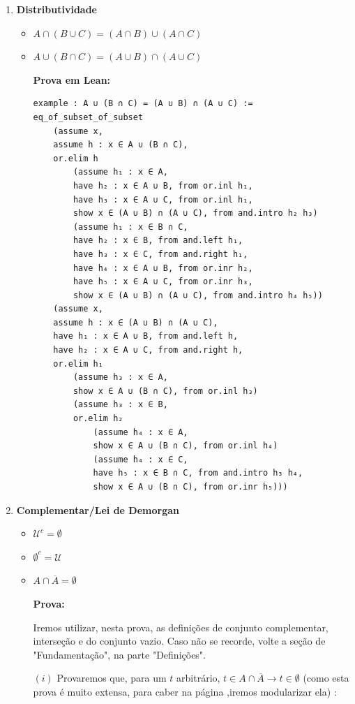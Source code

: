 \begin{enumerate}
\item{\textbf{Distributividade}}
\begin{itemize}
\item $A \cap (B \cup C) = (A \cap B) \cup (A \cap C)$
\item $A \cup (B \cap C) = (A \cup B) \cap (A \cup C)$

\textbf{Prova em Lean:}
\begin{lstlisting}
example : A ∪ (B ∩ C) = (A ∪ B) ∩ (A ∪ C) :=
eq_of_subset_of_subset
    (assume x,
    assume h : x ∈ A ∪ (B ∩ C),
    or.elim h
        (assume h₁ : x ∈ A,
        have h₂ : x ∈ A ∪ B, from or.inl h₁,
        have h₃ : x ∈ A ∪ C, from or.inl h₁,
        show x ∈ (A ∪ B) ∩ (A ∪ C), from and.intro h₂ h₃)
        (assume h₁ : x ∈ B ∩ C,
        have h₂ : x ∈ B, from and.left h₁,
        have h₃ : x ∈ C, from and.right h₁,
        have h₄ : x ∈ A ∪ B, from or.inr h₂,
        have h₅ : x ∈ A ∪ C, from or.inr h₃,
        show x ∈ (A ∪ B) ∩ (A ∪ C), from and.intro h₄ h₅))
    (assume x,
    assume h : x ∈ (A ∪ B) ∩ (A ∪ C),
    have h₁ : x ∈ A ∪ B, from and.left h,
    have h₂ : x ∈ A ∪ C, from and.right h,
    or.elim h₁
        (assume h₃ : x ∈ A,
        show x ∈ A ∪ (B ∩ C), from or.inl h₃)
        (assume h₃ : x ∈ B,
        or.elim h₂
            (assume h₄ : x ∈ A,
            show x ∈ A ∪ (B ∩ C), from or.inl h₄)
            (assume h₄ : x ∈ C,
            have h₅ : x ∈ B ∩ C, from and.intro h₃ h₄,
            show x ∈ A ∪ (B ∩ C), from or.inr h₅))) \end{lstlisting}

\end{itemize}

\item{\textbf{Complementar/Lei de Demorgan}}
\begin{itemize}
\item $\mathcal U ^c = \emptyset$
\item $\emptyset ^c = \mathcal U$

\qquad

\item $A \cap \overline{A} = \emptyset$

\textbf{Prova:}
    
    Iremos utilizar, nesta prova, as definições de conjunto complementar, interseção e do conjunto vazio. Caso não se recorde, volte a seção de "Fundamentação", na parte "Definições".
    
    $(i)$ Provaremos que, para um $t$ arbitrário, $ t \in A \cap \overline A \rightarrow t \in \emptyset $ (como esta prova é muito extensa, para caber na página ,iremos modularizar ela) :
    

\end{itemize}
\end{enumerate}
